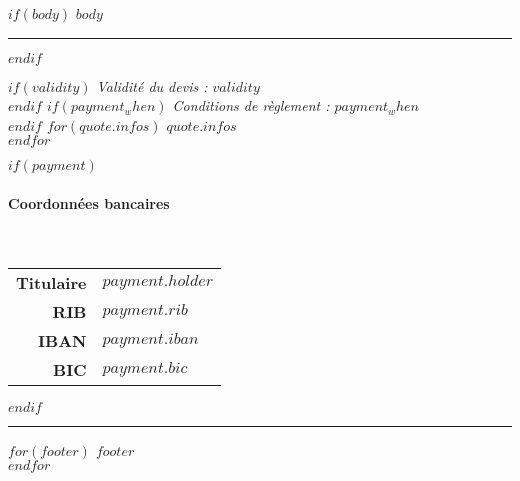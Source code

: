 \documentclass[$fontsize$, a4paper]{article}
\begin{document}
\vspace{10mm}

$if(body)$
{
  \setlength{\parskip}{3mm}
  $body$
}

\rule{\textwidth}{0.5pt}
$endif$

{
  \itshape
  $if(validity)$
    Validité du devis : $validity$ \\
  $endif$
  $if(payment_when)$
    Conditions de règlement : $payment_when$ \\
  $endif$
  $for(quote.infos)$
  $quote.infos$ \\
  $endfor$
}

\vfill

$if(payment)$
\paragraph{Coordonnées bancaires} ~\\[5pt]

\sffamily
\begin{tabular}{rl}
  \textbf{Titulaire} & $payment.holder$ \\
  \textbf{RIB}       & $payment.rib$ \\
  \textbf{IBAN}      & $payment.iban$ \\
  \textbf{BIC}       & $payment.bic$ \\
\end{tabular}
$endif$




\rule{\textwidth}{1pt}

\begin{minipage}{\textwidth}
  \footnotesize
  \itshape
  \sffamily
  \onehalfspacing
  \centering
  $for(footer)$
  $footer$ \\
  $endfor$
\end{minipage}
\end{document}
